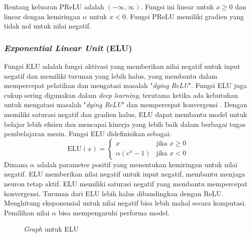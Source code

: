 Rentang keluaran PReLU adalah \((-\infty, \infty)\). Fungsi ini linear untuk \(x \geq 0\) dan linear dengan kemiringan \(\alpha\) untuk \(x < 0\). Fungsi PReLU memiliki gradien yang tidak nol untuk nilai negatif.

\subsubsection{\textit{Exponential Linear Unit} (ELU)}

Fungsi ELU adalah fungsi aktivasi yang memberikan nilai negatif untuk input negatif dan memiliki turunan yang lebih halus, yang membantu dalam mempercepat pelatihan dan mengatasi masalah "\textit{dying ReLU}". Fungsi ELU juga cukup sering digunakan dalam \textit{deep learning}, terutama ketika ada kebutuhan untuk mengatasi masalah "\textit{dying ReLU}" dan mempercepat konvergensi \cite{Bonaccorso2020-ec}. Dengan memiliki saturasi negatif dan gradien halus, ELU dapat membantu model untuk belajar lebih efisien dan mencapai kinerja yang lebih baik dalam berbagai tugas pembelajaran mesin. Fungsi ELU didefinisikan sebagai:
\begin{equation}
    \text{ELU}(x) = \begin{cases} 
x & \text{jika } x \geq 0 \\
\alpha (e^x - 1) & \text{jika } x < 0 
\end{cases}
\end{equation}
Dimana \(\alpha\) adalah parameter positif yang menentukan kemiringan untuk nilai negatif. ELU memberikan nilai negatif untuk input negatif, membantu menjaga neuron tetap aktif. ELU memiliki saturasi negatif yang membantu mempercepat konvergensi. Turunan dari ELU lebih halus dibandingkan dengan ReLU. Menghitung eksponensial untuk nilai negatif bisa lebih mahal secara komputasi. Pemilihan nilai \(\alpha\) bisa mempengaruhi performa model.

\begin{figure}[H]
    \centering
    \caption{\textit{Graph} untuk ELU}
    \label{fig:enter-label}
\end{figure}


